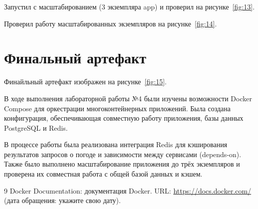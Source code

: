 Запустил с масштабированием (3 экземпляра app) и проверил на рисунке~\ref{fig:13}.


Проверил работу масштабированных экземпляров на рисунке~\ref{fig:14}.


\section{Финальный артефакт}

Финайльный артефакт изображен на рисунке~\ref{fig:15}.



В ходе выполнения лабораторной работы №4 были изучены возможности Docker Compose для оркестрации многоконтейнерных приложений. Была создана конфигурация, обеспечивающая совместную работу приложения, базы данных PostgreSQL и Redis.

В процессе работы была реализована интеграция Redis для кэширования результатов запросов о погоде и зависимости между сервисами (depends-on). Также было выполнено масштабирование приложения до трёх экземпляров и проверена их совместная работа с общей базой данных и кэшем.


\begin{thebibliography}{9}
  Docker Documentation: документация Docker.
  URL: \url{https://docs.docker.com/}
  (дата обращения: укажите свою дату).
\end{thebibliography}

